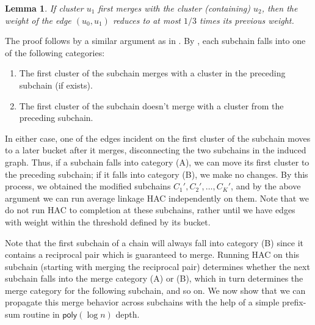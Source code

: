 \documentclass[11pt]{article}
\newcommand{\poly}{\ensuremath{\mathsf{poly}}}
\newtheorem{lemma}{Lemma}
\begin{document}
\begin{lemma}\label{lem:path_B}
    If cluster $u_1$ first merges with the cluster (containing) $u_2$, then the weight of the edge $(u_0,u_1)$ reduces to at most $1/3$ times its previous weight.
\end{lemma}
The proof follows by a similar argument as in . By , each subchain falls into one of the following categories:
\begin{enumerate}[label=(\Alph*)]
    \item The first cluster of the subchain merges with a cluster in the preceding subchain (if exists).
    \item The first cluster of the subchain doesn't merge with a cluster from the preceding subchain.
\end{enumerate}
In either case, one of the edges incident on the first cluster of the subchain moves to a later bucket after it merges, disconnecting the two subchains in the induced graph. Thus, if a subchain falls into category (A), we can move its first cluster to the preceding subchain; if it falls into category (B), we make no changes. By this process, we obtained the modified subchains $C_1',C_2',\ldots,C_K'$, and by the above argument we can run average linkage HAC independently on them. Note that we do not run HAC to completion at these subchains, rather until we have edges with weight within the threshold defined by its bucket. 

Note that the first subchain of a chain will always fall into category (B) since it contains a reciprocal pair which is guaranteed to merge.
Running HAC on this subchain (starting with merging the reciprocal pair) determines whether the next subchain falls into the merge category (A) or (B), which in turn determines the merge category for the following subchain, and so on. 
We now show that we can propagate this merge behavior across subchains with the help of a simple prefix-sum routine in $\poly(\log n)$ depth.
\end{document}
